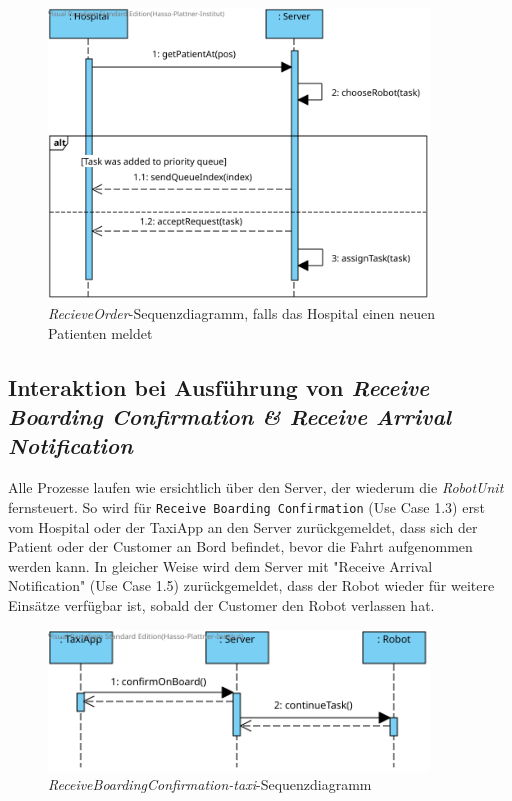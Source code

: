 \begin{figure}[H]
	\centering
	\includegraphics[width=0.9\textwidth]{img/2-Entwurf-ReceiveOrder-Hosp}
	\caption{\emph{RecieveOrder}-Sequenzdiagramm, falls das Hospital einen neuen Patienten meldet}
	\label{SequenzDiagrammInteraktion}
\end{figure}



\subsection*{Interaktion bei Ausführung von \emph{Receive Boarding Confirmation \& Receive Arrival Notification}}

Alle Prozesse laufen wie ersichtlich über den Server, der wiederum die \emph{RobotUnit} fernsteuert. 
So wird für \texttt{Receive Boarding Confirmation} (Use Case 1.3) erst vom Hospital oder der TaxiApp an den Server zurückgemeldet, dass sich der Patient oder der Customer an Bord befindet, bevor die Fahrt aufgenommen werden kann. 
In gleicher Weise wird dem Server mit "Receive Arrival Notification" (Use Case 1.5) zurückgemeldet, dass der Robot wieder für weitere Einsätze verfügbar ist, sobald der Customer den Robot verlassen hat.  \\

\begin{figure}[H]
	\centering
	\includegraphics[width=0.9\textwidth]{img/2-Entwurf-ReceiveBoardingConfirmation-taxi}
	\caption{\emph{ReceiveBoardingConfirmation-taxi}-Sequenzdiagramm}
	\label{SequenzDiagrammInteraktion}
\end{figure}

